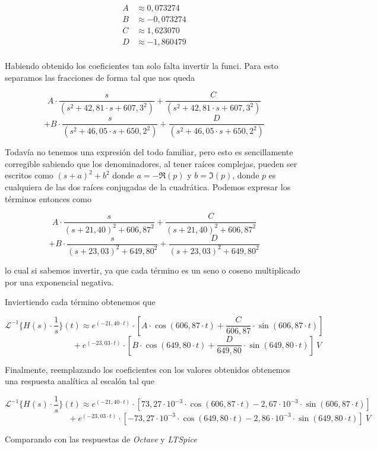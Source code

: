 \documentclass[11pt,a4paper]{report}
\begin{document}
\begin{align*}
A &\approx 0,073274 \\
B &\approx -0,073274 \\
C &\approx 1,623070 \\
D &\approx -1,860479 \\
\end{align*}

Habiendo obtenido los coeficientes tan solo falta invertir la funci. Para esto separamos las fracciones de forma tal que nos queda

\[A \cdot \frac{s}{(s^2+42,81 \cdot s + 607,3^2)} + \frac{C}{(s^2+42,81 \cdot s + 607,3^2)}\] 
\[+ B \cdot \frac{s}{(s^2+46,05 \cdot s + 650,2^2)} + \frac{D}{(s^2+46,05 \cdot s + 650,2^2)}\]

Todavía no tenemos una expresión del todo familiar, pero esto es sencillamente corregible sabiendo que los denominadores, al tener raíces complejas, pueden ser escritos como $(s+a)^2+b^2$ donde $a = -\Re(p)$ y $b = \Im(p)$, donde $p$ es cualquiera de las dos raíces conjugadas de la cuadrática. Podemos expresar los términos entonces como

\[A \cdot \frac{s}{(s+21,40)^2 + 606,87^2} + \frac{C}{(s+21,40)^2 + 606,87^2}\] 
\[+ B \cdot \frac{s}{(s+23,03)^2 + 649,80^2} + \frac{D}{(s+23,03)^2 + 649,80^2}\]

lo cual si sabemos invertir, ya que cada término es un seno o coseno multiplicado por una exponencial negativa.

\bigskip
Inviertiendo cada término obtenemos que

\[\mathcal{L}^{-1}\{H(s) \cdot \frac{1}{s}\}(t) \approx e^{(-21,40 \cdot t)} \cdot [A \cdot \cos(606,87 \cdot t) + \frac{C}{606,87} \cdot \sin(606,87 \cdot t)]\] 
\[\phantom{asadsdasdasdasda} + e^{(-23,03 \cdot t)} \cdot [B \cdot \cos(649,80 \cdot t) + \frac{D}{649,80} \cdot \sin(649,80 \cdot t)] \ V\]

\bigskip
Finalmente, reemplazando los coeficientes con los valores obtenidos obtenemos una respuesta analítica al escalón tal que

\[\mathcal{L}^{-1}\{H(s) \cdot \frac{1}{s}\}(t) \approx e^{(-21,40 \cdot t)} \cdot [73,27 \cdot 10^{-3} \cdot \cos(606,87 \cdot t) - 2,67 \cdot 10^{-3} \cdot \sin(606,87 \cdot t)]\] 
\[\phantom{asadsdasdsdasda} + e^{(-23,03 \cdot t)} \cdot [-73,27 \cdot 10^{-3} \cdot \cos(649,80 \cdot t) - 2,86 \cdot 10^{-3} \cdot \sin(649,80 \cdot t)] \ V\]

Comparando con las respuestas de \textit{Octave} y \textit{LTSpice}
\end{document}
